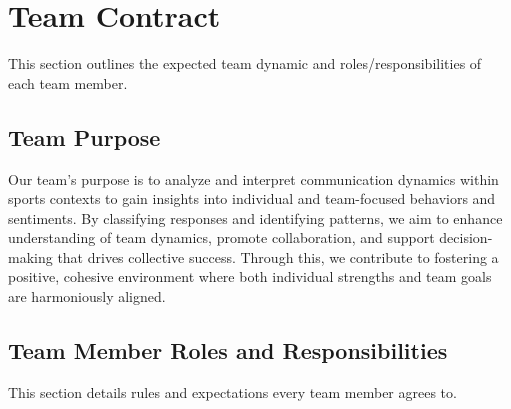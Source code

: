 \documentclass[titlepage]{article}
\begin{document}
\section{Team Contract}
This section outlines the expected team dynamic and roles/responsibilities of each team member.

\subsection{Team Purpose}
Our team's purpose is to analyze and interpret communication dynamics
within sports contexts to gain insights into individual and
team-focused behaviors and sentiments. By classifying responses and
identifying patterns, we aim to enhance understanding of team
dynamics, promote collaboration, and support decision-making that
drives collective success. Through this, we contribute to fostering a
positive, cohesive environment where both individual strengths and
team goals are harmoniously aligned.

\subsection{Team Member Roles and Responsibilities}
This section details rules and expectations every team member agrees to.
\end{document}
